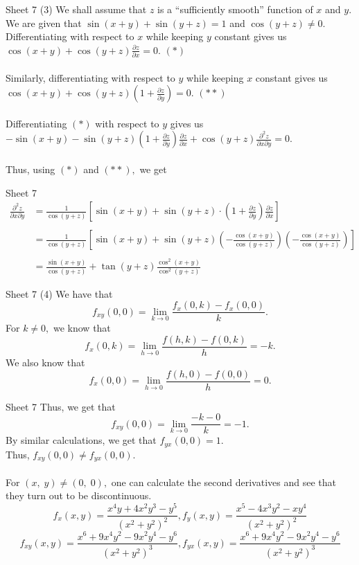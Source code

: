 \documentclass[handout, aspectratio=169]{beamer}
\begin{document}
\begin{frame}{Sheet 7}
	(3) We shall assume that $z$ is a ``sufficiently smooth'' function of $x$ and $y.$\\
	We are given that $\sin (x+y)+\sin (y+z)=1$ and $\cos (y+z) \neq 0.$\\ 
	Differentiating with respect to $x$ while keeping $y$ constant gives us $\cos (x+y)+\cos (y+z) \frac{\partial z}{\partial x}=0.$ \hfill $(*)$\\~\\
	Similarly, differentiating with respect to $y$ while keeping $x$ constant gives us $\cos (x+y)+\cos (y+z)\left(1+\frac{\partial z}{\partial y}\right)=0.$ \hfill $(**)$\\~\\
	Differentiating $(*)$ with respect to $y$ gives us $-\sin (x+y)-\sin (y+z)\left(1+\frac{\partial z}{\partial y}\right) \frac{\partial z}{\partial x}+\cos (y+z) \frac{\partial^{2} z}{\partial x \partial y}=0.$\\~\\
	Thus, using $(*)$ and $(**),$ we get
\end{frame}
\begin{frame}{Sheet 7}
	\begin{align*} \frac{\partial^{2} z}{\partial x \partial y} &=\frac{1}{\cos (y+z)}\left[\sin (x+y)+\sin (y+z) \cdot\left(1+\frac{\partial z}{\partial y}\right) \frac{\partial z}{\partial x}\right] \\~\\ &=\frac{1}{\cos (y+z)}\left[\sin (x+y)+\sin (y+z)\left(-\frac{\cos (x+y)}{\cos (y+z)}\right)\left(-\frac{\cos (x+y)}{\cos (y+z)}\right)\right] \\~\\ &=\frac{\sin (x+y)}{\cos (y+z)}+\tan (y+z) \frac{\cos ^{2}(x+y)}{\cos ^{2}(y+z)} \end{align*}
\end{frame}

\begin{frame}{Sheet 7}
	(4) We have that
	\[f_{x y}(0,0)=\lim _{k \rightarrow 0} \frac{f_{x}(0, k)-f_{x}(0,0)}{k}.\]
	For $k \neq 0,$ we know that
	\[f_{x}(0, k)=\lim _{h \rightarrow 0} \frac{f(h, k)-f(0, k)}{h}=-k.\]
	We also know that 
	\[f_{x}(0,0)=\lim _{h \rightarrow 0} \frac{f(h, 0)-f(0,0)}{h}=0.\]
\end{frame}

\begin{frame}{Sheet 7}
	Thus, we get that
	\[f_{x y}(0,0)=\lim _{k \rightarrow 0} \frac{-k-0}{k}=-1.\]
	By similar calculations, we get that $f_{y x}(0,0)=1.$\\
	Thus, $f_{x y}(0,0) \neq f_{y x}(0,0).$\\~\\
	For $(x,\;y) \neq (0,\;0),$ one can calculate the second derivatives and see that they turn out to be discontinuous.
	\[{f_{x}(x, y)=\frac{x^{4} y+4 x^{2} y^{3}-y^{5}}{\left(x^{2}+y^{2}\right)^{2}}, f_{y}(x, y)=\frac{x^{5}-4 x^{3} y^{2}-x y^{4}}{\left(x^{2}+y^{2}\right)^{2}}} \]
	\[ {f_{xy}(x,y)=\frac{x^{6}+9 x^{4} y^{2}-9 x^{2} y^{4}-y^{6}}{\left(x^{2}+y^{2}\right)^{3}},f_{yx}(x, y)=\frac{x^{6}+9 x^{4} y^{2}-9 x^{2} y^{4}-y^{6}}{\left(x^{2}+y^{2}\right)^{3}}}\]
\end{frame}
\end{document}
